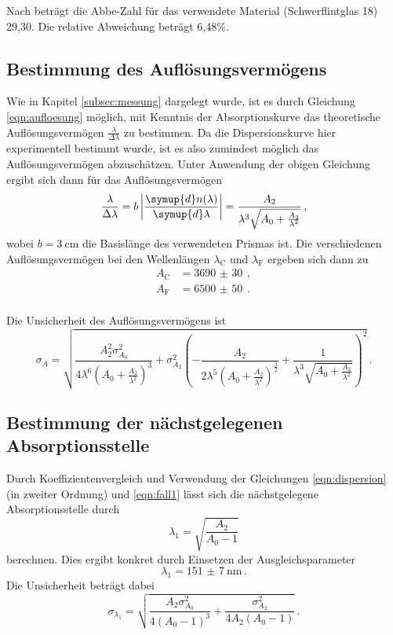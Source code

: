 Nach \cite{flint} beträgt die Abbe-Zahl für das verwendete Material (Schwerflintglas 18)
29{,}30. Die relative Abweichung beträgt 6{,}48\%.

\subsection{Bestimmung des Auflösungsvermögens}
\label{subsec:auflösung}
Wie in Kapitel \ref{subsec:messung} dargelegt wurde, ist es durch Gleichung \eqref{eqn:aufloesung} möglich,
mit Kenntnis der Absorptionskurve das theoretische Auflösungsvermögen $\frac{\lambda}{\Delta \lambda}$ zu bestimmen.
Da die Dispersionskurve hier experimentell bestimmt wurde, ist es also zumindest möglich
das Auflösungsvermögen abzuschätzen. Unter Anwendung der obigen Gleichung ergibt sich dann
für das Auflösungsvermögen
\begin{equation}
  \frac{\lambda}{\Delta \lambda} = b \left|\frac{\symup{d}n(\lambda)}{\symup{d}\lambda}\right| = \frac{A_2}{\lambda^3\sqrt{A_0 + \frac{A_2}{\lambda^2}}}\,,
\end{equation}
wobei $b = \SI{3}{\centi\meter}$ die Basislänge des verwendeten Prismas ist.
Die verschiedenen Auflösungsvermögen bei den Wellenlängen $\lambda_\text{C}$ und $\lambda_\text{F}$
ergeben sich dann zu
\begin{align*}
  A_\text{C} &= \SI{3690(30)}{}\,, \\
  A_\text{F} &= \SI{6500(50)}{}\,. \\
\end{align*}

Die Unsicherheit des Auflösungsvermögens ist
\begin{equation*}
  \sigma_A = \sqrt{\frac{A_2^{2} \sigma_{A_0}^{2}}{4 \lambda^{6} \left(A_0 + \frac{A_2}{\lambda^{2}}\right)^{3}}
  + \sigma_{A_2}^{2} \left(- \frac{A_2}{2 \lambda^{5} \left(A_0 + \frac{A_2}{\lambda^{2}}\right)^{\frac{3}{2}}}
  + \frac{1}{\lambda^{3} \sqrt{A_0 + \frac{A_2}{\lambda^{2}}}}\right)^{2}} \,.
\end{equation*}

\subsection{Bestimmung der nächstgelegenen Absorptionsstelle}
\label{subsec:absorptionsstelle}
Durch Koeffizientenvergleich und Verwendung der Gleichungen \eqref{eqn:dispersion} (in zweiter Ordnung)
und \eqref{eqn:fall1} lässt sich die nächstgelegene Absorptionsstelle durch
\begin{equation*}
  \lambda_1 = \sqrt{\frac{A_2}{A_0-1}}
\end{equation*}
berechnen. Dies ergibt konkret durch Einsetzen der Ausgleichsparameter
\begin{equation*}
  \lambda_1 = \SI{151(7)}{\nano\meter}\,.
\end{equation*}
Die Unsicherheit beträgt dabei
\begin{equation*}
  \sigma_{\lambda_1} = \sqrt{\frac{A_{2} \sigma_{A_{0}}^{2}}{4 \left(A_{0} - 1\right)^{3}} + \frac{\sigma_{A_{2}}^{2}}{4 A_{2} \left(A_{0} - 1\right)}}\,.
\end{equation*}
